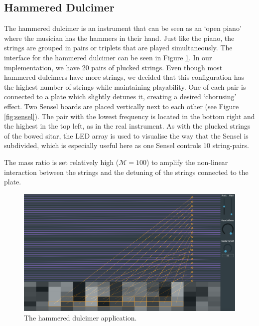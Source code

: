     \subsection{Hammered Dulcimer}
    The hammered dulcimer is an instrument that can be seen as an `open piano' where the musician has the hammers in their hand. Just like the piano, the strings are grouped in pairs or triplets
    that are played simultaneously. 
    The interface for the hammered dulcimer can be seen in Figure  \ref{fig:dulcimer}.
    In our implementation, we have 20 pairs of plucked strings. Even though most hammered dulcimers have more strings, we decided that this configuration has the highest number of strings while maintaining playability. One of each pair is connected to a plate which slightly detunes it, creating a desired `chorusing' effect. 
    Two Sensel boards are placed vertically next to each other (see Figure \ref{fig:sensel}). The pair with the lowest frequency is located in the bottom right and the highest in the top left, as in the real instrument. As with the plucked strings of the bowed sitar, the LED array is used to visualise the way that the Sensel is subdivided, which is especially useful here as one Sensel controls 10 string-pairs. 
    
    The mass ratio is set relatively high ($\mathcal{M} = 100$) to amplify the non-linear interaction between the strings and the detuning of the strings connected to the plate. 
    
    \begin{figure}[h]
    \centering
    \includegraphics[width=\paperFigWidth\textwidth]{figures/dulcimer.png}
    \caption{The hammered dulcimer application. \label{fig:dulcimer}}
    \end{figure}
    
